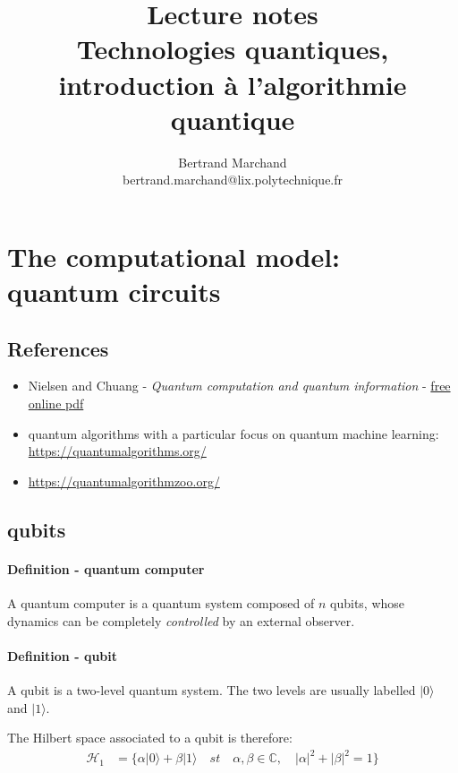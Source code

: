 \documentclass{article}
\title{Lecture notes \\
Technologies quantiques, introduction à l'algorithmie quantique}
\author{Bertrand Marchand \\ bertrand.marchand@lix.polytechnique.fr}
\begin{document}
\maketitle
\tableofcontents
\section{The computational model: quantum circuits}

\subsection{References}

\begin{itemize}
    \item Nielsen and Chuang - \emph{Quantum computation and quantum information} - \textcolor{blue}{\href{http://mmrc.amss.cas.cn/tlb/201702/W020170224608149940643.pdf}{free online pdf}}
    \item quantum algorithms with a particular focus on quantum machine learning: \textcolor{blue}{\href{https://quantumalgorithms.org/}{https://quantumalgorithms.org/}}
    \item \textcolor{blue}{\href{https://quantumalgorithmzoo.org/}{https://quantumalgorithmzoo.org/}}
\end{itemize}

\subsection{qubits}

\paragraph{Definition - quantum computer} A quantum computer is a quantum system composed of $n$ qubits,
whose dynamics can be completely \emph{controlled} by an external observer. 

\paragraph{Definition - qubit} A qubit is a two-level quantum system. The two levels are usually labelled
$|0\rangle$ and $|1\rangle$.

The Hilbert space associated to a qubit is therefore: 
\begin{align*}
\mathcal{H}_1 &= \{\alpha |0\rangle + \beta |1\rangle\quad st \quad\alpha,\beta\in\mathbb{C},\quad|\alpha|^{2}+|\beta|^2=1\}
\end{align*}
\end{document}
